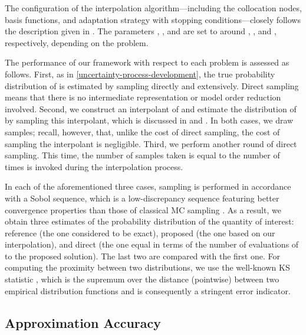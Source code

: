 The configuration of the interpolation algorithm---including the collocation
nodes, basis functions, and adaptation strategy with stopping
conditions---closely follows the description given in .
The parameters , , and  are set to around
, , and , respectively, depending on the
problem.

The performance of our framework with respect to each problem is assessed as
follows. First, as in \cref{uncertainty-process-development}, the true
probability distribution of \g is estimated by sampling \g directly and
extensively. Direct sampling means that there is no intermediate representation
or model order reduction involved. Second, we construct an interpolant of \g and
estimate the distribution of \g by sampling this interpolant, which is discussed
in  and . In both cases, we draw
 samples; recall, however, that, unlike the cost of direct
sampling, the cost of sampling the interpolant is negligible. Third, we perform
another round of direct sampling. This time, the number of samples taken is
equal to the number of times \g is invoked during the interpolation process.

In each of the aforementioned three cases, sampling is performed in accordance
with a Sobol sequence, which is a low-discrepancy sequence featuring better
convergence properties than those of classical \ac{MC} sampling \cite{joe2008}.
As a result, we obtain three estimates of the probability distribution of the
quantity of interest: reference (the one considered to be exact), proposed (the
one based on our interpolation), and direct (the one equal in terms of the
number of evaluations of \g to the proposed solution). The last two are compared
with the first one. For computing the proximity between two distributions, we
use the well-known \ac{KS} statistic \cite{rao2002}, which is the supremum over
the distance (pointwise) between two empirical distribution functions and is
consequently a stringent error indicator.

\subsection{Approximation Accuracy}

